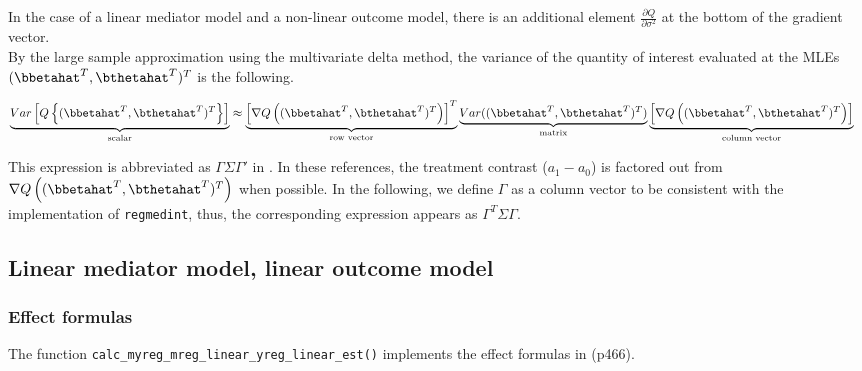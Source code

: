\documentclass[10pt]{article}
\begin{document}
In the case of a linear mediator model and a non-linear outcome model, there is an additional element \(\frac{\partial Q}{\partial \sigma^{2}}\) at the bottom of the gradient vector.\\

By the large sample approximation using the multivariate delta method, the variance of the quantity of interest evaluated at the MLEs \((\bbetahat^{T},\bthetahat^{T})^{T}\) is the following.

\begin{align*}
  \underbrace{Var \left[ Q\left\{ (\bbetahat^{T},\bthetahat^{T})^{T} \right\} \right]}_{\text{scalar}}
  &\approx
  \underbrace{\left[ \nabla Q \left( (\bbetahat^{T},\bthetahat^{T})^{T} \right) \right]^{T}}_{\text{row vector}}
  \underbrace{Var((\bbetahat^{T},\bthetahat^{T})^{T})}_{\text{matrix}}
  \underbrace{\left[ \nabla Q \left( (\bbetahat^{T},\bthetahat^{T})^{T} \right) \right]}_{\text{column vector}}
\end{align*}

This expression is abbreviated as \(\Gamma\Sigma\Gamma'\) in \cite{vanderweeleExplanationCausalInference2015,valeriMediationAnalysisAllowing2013,valeriSASMacroCausal2015}. In these references, the treatment contrast (\(a_{1}-a_{0}\)) is factored out from \(\nabla Q \left( (\bbetahat^{T},\bthetahat^{T})^{T} \right)\) when possible. In the following, we define \(\Gamma\) as a column vector to be consistent with the implementation of \texttt{regmedint}, thus, the corresponding expression appears as \(\Gamma^{T}\Sigma\Gamma\).

\subsection{Linear mediator model, linear outcome model}
\label{sec:org63a2bb8}
\subsubsection{Effect formulas}
\label{sec:orgf13941d}
The function \texttt{calc\_myreg\_mreg\_linear\_yreg\_linear\_est()} implements the effect formulas in \cite{vanderweeleExplanationCausalInference2015} (p466).
\end{document}
